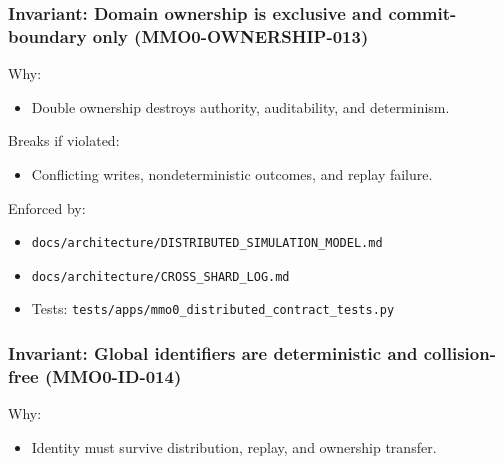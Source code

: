 \documentclass[9pt,a4paper,openany]{book}
\begin{document}
\subsubsection{Invariant: Domain ownership is exclusive and commit-boundary only (MMO0-OWNERSHIP-013)}


Why:



\begin{itemize}
\item Double ownership destroys authority, auditability, and determinism.\allowbreak{}
\end{itemize}


Breaks if violated:



\begin{itemize}
\item Conflicting writes, nondeterministic outcomes, and replay failure.\allowbreak{}
\end{itemize}


Enforced by:



\begin{itemize}
\item \texttt{docs/\allowbreak{}architecture/\allowbreak{}DISTRIBUTED\_\allowbreak{}SIMULATION\_\allowbreak{}MODEL.\allowbreak{}md}
\end{itemize}


\begin{itemize}
\item \texttt{docs/\allowbreak{}architecture/\allowbreak{}CROSS\_\allowbreak{}SHARD\_\allowbreak{}LOG.\allowbreak{}md}
\end{itemize}


\begin{itemize}
\item Tests: \texttt{tests/\allowbreak{}apps/\allowbreak{}mmo0\_\allowbreak{}distributed\_\allowbreak{}contract\_\allowbreak{}tests.\allowbreak{}py}
\end{itemize}





\subsubsection{Invariant: Global identifiers are deterministic and collision-free (MMO0-ID-014)}


Why:



\begin{itemize}
\item Identity must survive distribution, replay, and ownership transfer.\allowbreak{}
\end{itemize}
\end{document}
